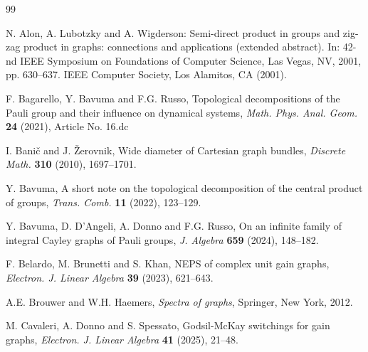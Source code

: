 \documentclass{amsart}
\theoremstyle{definition}
\numberwithin{equation}{section}
\begin{document}
\begin{thebibliography}{99}

N.  Alon,  A. Lubotzky and A. Wigderson: Semi-direct product in groups and zig-zag product in graphs: connections and applications (extended abstract). In: 42-nd IEEE Symposium on Foundations of Computer Science, Las Vegas, NV, 2001, pp. 630–637. IEEE Computer Society, Los Alamitos, CA (2001).



 F. Bagarello, Y. Bavuma and F.G. Russo, Topological decompositions of the Pauli group and their influence on dynamical systems, \textit{Math. Phys. Anal. Geom.} \textbf{24} (2021), Article No. 16.dc



 I. Banič and J. Žerovnik, Wide diameter of Cartesian graph bundles, \textit{Discrete Math.} \textbf{310}  (2010), 1697--1701. 

 Y. Bavuma, A short note on the topological decomposition of the central product of groups, \textit{Trans. Comb.} \textbf{11} (2022), 123--129.

 Y. Bavuma, D. D’Angeli, A. Donno and F.G. Russo, On an infinite family of integral Cayley graphs of Pauli groups, \textit{J. Algebra} \textbf{659} (2024), 148--182.

 F. Belardo, M. Brunetti and S. Khan, NEPS of complex unit gain graphs, \textit{Electron. J. Linear Algebra} \textbf{39} (2023), 621--643.


 A.E. Brouwer and W.H. Haemers, \textit{Spectra of graphs}, Springer, New York, 2012.


 M. Cavaleri, A. Donno and S. Spessato, Godsil-McKay switchings for gain graphs, \textit{Electron. J. Linear Algebra} \textbf{41} (2025), 21--48.



\end{thebibliography}
\end{document}
